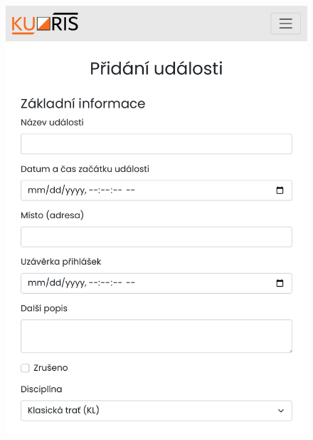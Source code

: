 \begin{figure}[h]
\begin{minipage}[b]{0.47\linewidth}
        \includegraphics[width=\linewidth]{images/form-responsive-layout.pdf}
    \end{minipage}
\end{figure}
